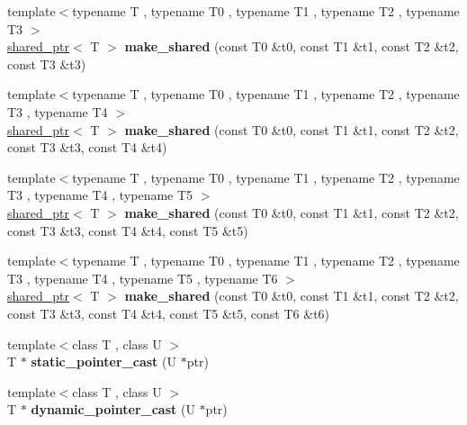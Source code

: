 \begin{DoxyCompactItemize}
\item 
\hypertarget{namespaceboost_a12c12884e6c3bca00e33d94e67a24369}{{\footnotesize template$<$typename T , typename T0 , typename T1 , typename T2 , typename T3 $>$ }\\\hyperlink{classboost_1_1shared__ptr}{shared\+\_\+ptr}$<$ T $>$ {\bfseries make\+\_\+shared} (const T0 \&t0, const T1 \&t1, const T2 \&t2, const T3 \&t3)}\label{namespaceboost_a12c12884e6c3bca00e33d94e67a24369}

\item 
\hypertarget{namespaceboost_afea0e7f046d78019ed10ec0da8abfa46}{{\footnotesize template$<$typename T , typename T0 , typename T1 , typename T2 , typename T3 , typename T4 $>$ }\\\hyperlink{classboost_1_1shared__ptr}{shared\+\_\+ptr}$<$ T $>$ {\bfseries make\+\_\+shared} (const T0 \&t0, const T1 \&t1, const T2 \&t2, const T3 \&t3, const T4 \&t4)}\label{namespaceboost_afea0e7f046d78019ed10ec0da8abfa46}

\item 
\hypertarget{namespaceboost_a809fb2bff942540ab24b177cde38daf6}{{\footnotesize template$<$typename T , typename T0 , typename T1 , typename T2 , typename T3 , typename T4 , typename T5 $>$ }\\\hyperlink{classboost_1_1shared__ptr}{shared\+\_\+ptr}$<$ T $>$ {\bfseries make\+\_\+shared} (const T0 \&t0, const T1 \&t1, const T2 \&t2, const T3 \&t3, const T4 \&t4, const T5 \&t5)}\label{namespaceboost_a809fb2bff942540ab24b177cde38daf6}

\item 
\hypertarget{namespaceboost_a3e3586f38201f1c6d3b4e3e7126d536d}{{\footnotesize template$<$typename T , typename T0 , typename T1 , typename T2 , typename T3 , typename T4 , typename T5 , typename T6 $>$ }\\\hyperlink{classboost_1_1shared__ptr}{shared\+\_\+ptr}$<$ T $>$ {\bfseries make\+\_\+shared} (const T0 \&t0, const T1 \&t1, const T2 \&t2, const T3 \&t3, const T4 \&t4, const T5 \&t5, const T6 \&t6)}\label{namespaceboost_a3e3586f38201f1c6d3b4e3e7126d536d}

\item 
\hypertarget{namespaceboost_a18243d0ad38dca8d1d29766b278e5916}{{\footnotesize template$<$class T , class U $>$ }\\T $\ast$ {\bfseries static\+\_\+pointer\+\_\+cast} (U $\ast$ptr)}\label{namespaceboost_a18243d0ad38dca8d1d29766b278e5916}

\item 
\hypertarget{namespaceboost_a21c303d8ed02a9ca8531384b9be5a396}{{\footnotesize template$<$class T , class U $>$ }\\T $\ast$ {\bfseries dynamic\+\_\+pointer\+\_\+cast} (U $\ast$ptr)}\label{namespaceboost_a21c303d8ed02a9ca8531384b9be5a396}


\end{DoxyCompactItemize}
